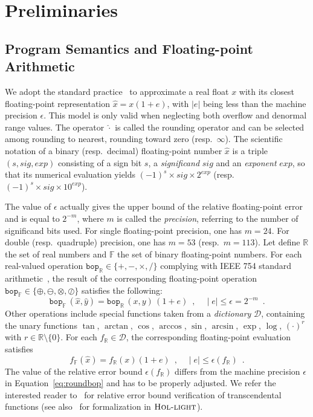 \documentclass[a4paper,10pt]{article}
\newcommand{\setD}{\mathcal{D}} %
\newcommand{\R}{\mathbb{R}}
\newcommand{\F}{\mathbb{F}}
\newcommand{\hol}{\text{\sc Hol-light}}
\newcommand{\bop}{\mathtt{bop}}
\theoremstyle{plain}
\theoremstyle{definition}
\theoremstyle{remark}
\begin{document}
\section{Preliminaries}
\label{sec:background}

\subsection{Program Semantics and Floating-point Arithmetic}
\label{sec:fpbackground}
We adopt the standard practice~\cite{higham2002accuracy} to approximate a real float $x$ with its closest floating-point representation $\hat{x} = x (1 + e)$, with $|e|$ being less than the machine precision $\epsilon$. This model is only valid when neglecting both overflow and denormal range values.
The operator $\hat{\cdot}$ is called the rounding operator and can be selected among rounding to nearest, rounding toward zero (resp.~$\infty$).
The scientific notation of a binary (resp.~decimal) floating-point number $\hat{x}$ is a triple $(s, sig, exp)$ consisting of a sign bit $s$, a {\em significand} $sig$ and an {\em exponent} $exp$, so that its numerical evaluation yields $(-1)^{s} \times sig \times 2^{exp}$ (resp.~$(-1)^{s} \times sig \times 10^{exp}$). 

The value of $\epsilon$ actually gives the upper bound of the relative floating-point error and is equal to $2^{-m}$, where $m$ is called the {\em precision}, referring to the number of significand bits used. For single floating-point precision, one has $m = 24$. For double (resp.~quadruple) precision, one has $m = 53$ (resp.~$m=113$). Let define $\R$ the set of real numbers and $\F$ the set of binary floating-point numbers.
For each real-valued operation $\bop_\R \in \{+, -, \times, \slash \}$ complying with IEEE 754 standard arithmetic~\cite{IEEE}, the result of the corresponding floating-point operation $\bop_\F \in \{\oplus, \ominus, \otimes, \oslash \}$ satisfies the following:
\begin{equation}
\label{eq:roundbop}
\bop_\F \, (\hat{x}, \hat{y}) = \bop_\R \, (x, y) \, (1 + e) \enspace, \quad \mid e \mid \leq \epsilon = 2^{-m} \enspace.
\end{equation}
%
Other operations include special functions taken from a {\em dictionary} $\setD$, containing the unary functions
$\tan$, $\arctan$, $\cos$, $\arccos$, $\sin$, $\arcsin$, $\exp$, $\log$, $(\cdot)^{r}$ with $r\in \R\setminus\{0\}$. For each $f_\R \in \setD$, the corresponding floating-point evaluation satisfies 
\begin{equation}
\label{eq:roundtransc}
f_\F (\hat{x}) = f_\R (x) (1 + e) \enspace, \quad \mid e \mid \leq \epsilon (f_\R) \enspace.
\end{equation}
The value of the relative error bound $\epsilon (f_\R)$ differs from the machine precision $\epsilon$ in Equation~\eqref{eq:roundbop} and has to be properly adjusted. We refer the interested reader to~\cite{VerifCADTransc} for relative error bound verification of transcendental functions (see also~\cite{VerifHOLTransc} for formalization in $\hol$).
%
\end{document}
